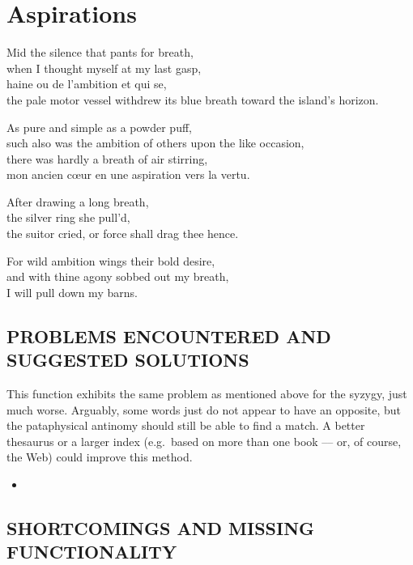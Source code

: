 
\chapter{Aspirations}
\label{ch:future}

\startcontents[chapters]

\vfill

Mid the silence that pants for breath, \\
when I thought myself at my last gasp, \\
haine ou de l'ambition et qui se, \\
the pale motor vessel withdrew its blue breath toward the island's horizon.

As pure and simple as a powder puff, \\
such also was the ambition of others upon the like occasion, \\
there was hardly a breath of air stirring, \\
mon ancien cœur en une aspiration vers la vertu.

After drawing a long breath, \\
the silver ring she pull'd, \\
the suitor cried, or force shall drag thee hence.

For wild ambition wings their bold desire, \\
and with thine agony sobbed out my breath, \\
I will pull down my barns.

\newpage
\minicontents
\spirals

\section{PROBLEMS ENCOUNTERED AND SUGGESTED SOLUTIONS}

This function exhibits the same problem as mentioned above for the syzygy, just much worse. Arguably, some words just do not appear to have an opposite, but the pataphysical antinomy should still be able to find a match. A better thesaurus or a larger index (e.g.\ based on more than one book –-- or, of course, the Web) could improve this method.

\begin{itemize}
  \item
\end{itemize}

\section{SHORTCOMINGS AND MISSING FUNCTIONALITY}

